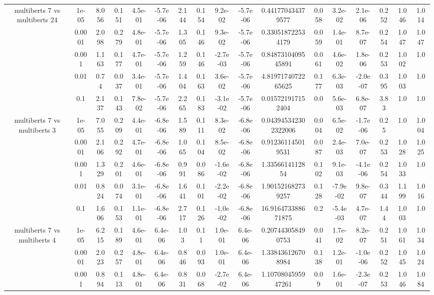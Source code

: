 \begin{tabular}{|c|c|c|c|c|c|c|c|c|c|c|c|c|c|c|c|c|}
\hline
\multirow{5}{*}{multiberts 7 vs multiberts 24} & 1e-05 & 8.056 & 0.151 & 4.5e-01 & -5.7e-06 & 2.144 & 0.154 & 9.2e-02 & -5.7e-06 & 0.441770434379577 & 0.058 & 3.2e-02 & 2.1e-06 & 0.252 & 1.046 & 1.014 \\
 & 0.0001 & 2.098 & 0.279 & 4.8e-01 & -5.7e-06 & 1.305 & 0.146 & 9.3e-02 & -5.7e-06 & 0.330518722534179 & 0.059 & 1.4e-01 & 8.7e-07 & 0.254 & 1.047 & 1.047 \\
 & 0.001 & 1.163 & 0.177 & 4.7e-01 & -5.7e-06 & 1.259 & 0.146 & -2.7e-03 & -5.7e-06 & 0.8487310409545891 & 0.061 & 4.6e-02 & 1.8e-06 & 0.253 & 1.002 & 1.0 \\
 & 0.01 & 0.74 & 0.037 & 3.4e-01 & -5.7e-06 & 1.404 & 0.163 & 3.6e-02 & -5.7e-06 & 4.8197174072265625 & 0.177 & 6.3e-03 & -2.0e-07 & 0.395 & 1.003 & 1.0 \\
 & 0.1 & 2.137 & 0.143 & 7.8e-02 & -5.7e-06 & 2.265 & 0.183 & -3.1e-02 & -5.7e-06 & 0.015721917152404 & 0.0 & 5.6e-03 & 6.8e-07 & 3.83 & 1.0 & 1.0 \\
\hline
\multirow{5}{*}{multiberts 7 vs multiberts 3} & 1e-05 & 7.055 & 0.209 & 4.4e-01 & -6.8e-06 & 1.589 & 0.111 & 8.3e-02 & -6.8e-06 & 0.043945342302322006 & 0.004 & 6.5e-02 & -1.7e-06 & 0.25 & 1.0 & 1.004 \\
 & 0.0001 & 2.106 & 0.292 & 4.7e-01 & -6.8e-06 & 1.065 & 0.104 & 8.5e-02 & -6.8e-06 & 0.912361145019531 & 0.087 & 2.4e-03 & 7.0e-07 & 0.253 & 1.028 & 1.025 \\
 & 0.001 & 1.329 & 0.201 & 4.6e-01 & -6.8e-06 & 0.991 & 0.086 & -1.6e-02 & -6.8e-06 & 1.3356614112854 & 0.102 & 9.1e-03 & -4.1e-06 & 0.254 & 1.033 & 1.0 \\
 & 0.01 & 0.824 & 0.074 & 3.1e-01 & -6.8e-06 & 1.641 & 0.101 & -2.2e-02 & -6.8e-06 & 1.901521682739257 & 0.128 & -7.9e-02 & 9.8e-07 & 0.344 & 1.199 & 1.016 \\
 & 0.1 & 1.606 & 0.153 & 1.1e-01 & -6.8e-06 & 2.717 & 0.126 & -1.0e-02 & -6.8e-06 & 16.916473388671875 & 0.2 & -5.4e-03 & 4.7e-07 & 1.44 & 1.003 & 1.0 \\
\hline
\multirow{5}{*}{multiberts 7 vs multiberts 4} & 1e-05 & 6.215 & 0.189 & 4.6e-01 & 6.4e-06 & 1.03 & 0.11 & 1.0e-01 & 6.4e-06 & 0.207443058490753 & 0.041 & 1.7e-02 & 8.2e-07 & 0.251 & 1.061 & 1.034 \\
 & 0.0001 & 2.023 & 0.257 & 4.8e-01 & 6.4e-06 & 0.846 & 0.093 & 1.0e-01 & 6.4e-06 & 1.338436126708984 & 0.138 & 1.2e-01 & -1.0e-06 & 0.252 & 1.045 & 1.024 \\
 & 0.001 & 0.894 & 0.113 & 4.8e-01 & 6.4e-06 & 0.831 & 0.068 & -2.7e-02 & 6.4e-06 & 1.1070804595947261 & 0.09 & 1.6e-01 & -2.3e-07 & 0.253 & 1.046 & 1.084 \\

\end{tabular}
